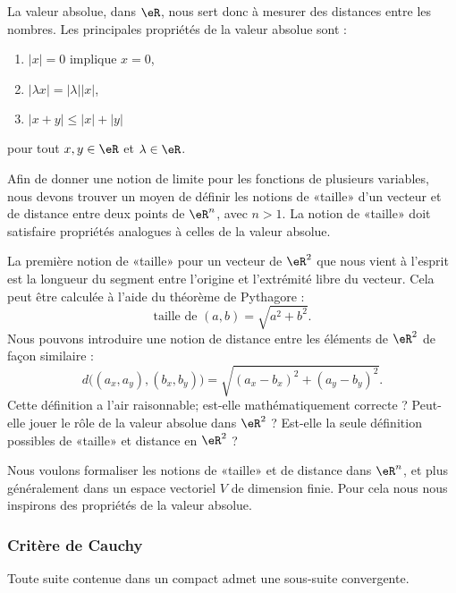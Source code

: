 La valeur absolue, dans \( \eR\), nous sert donc à mesurer des distances entre les nombres. Les principales propriétés de la valeur absolue sont :
\begin{enumerate}

	\item
	      \( | x |=0\) implique \( x=0\),
	\item
	      \( | \lambda x |=| \lambda | |x |\),
	\item
	      \( | x+y |\leq | x |+| y |\)

\end{enumerate}
pour tout \( x,y\in\eR\) et \( \lambda\in\eR\).

Afin de donner une notion de limite pour les fonctions de plusieurs variables, nous devons trouver un moyen de définir les notions de «taille» d'un vecteur et de distance entre deux points de \( \eR^n\), avec \( n>1\). La notion de «taille» doit satisfaire propriétés analogues à celles de la valeur absolue.

La première notion de «taille» pour un vecteur de \( \eR^2\) que nous vient à l'esprit est la longueur du segment entre l'origine et l'extrémité libre du vecteur. Cela peut être calculée à l'aide du théorème de Pythagore :
\begin{equation}
	\textrm{taille de } (a,b) = \sqrt{a^2+b^2}.
\end{equation}
Nous pouvons introduire une notion de distance entre les éléments de \( \eR^2\) de façon similaire :
\begin{equation}
	d\big((a_x,a_y),(b_x,b_y)\big)=\sqrt{  (a_x-b_x)^2+(a_y-b_y)^2  }.
\end{equation}
Cette définition a l'air raisonnable; est-elle mathématiquement correcte ? Peut-elle jouer le rôle de la valeur absolue dans \( \eR^2\) ? Est-elle la seule définition possibles de «taille» et distance en \( \eR^2\) ?

Nous voulons formaliser les notions de «taille» et de distance dans \( \eR^n\), et plus généralement dans un espace vectoriel \( V\) de dimension finie. Pour cela nous nous inspirons des propriétés de la valeur absolue.

\subsubsection{Critère de Cauchy}

\begin{theorem}     \label{THOooRDYOooJHLfGq}
	Toute suite contenue dans un compact admet une sous-suite convergente.
\end{theorem}

